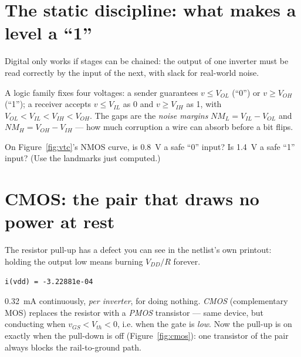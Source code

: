 \section{The static discipline: what makes a level a ``1''}
\label{sec:staticdisc}

Digital only works if stages can be chained: the output of one inverter must
be read correctly by the input of the next, with slack for real-world noise.

\begin{definition}
\label{def:noisemargin}
A logic family fixes four voltages: a sender guarantees $v \le V_{OL}$
(``0'') or $v \ge V_{OH}$ (``1''); a receiver accepts $v \le V_{IL}$ as 0
and $v \ge V_{IH}$ as 1, with $V_{OL} < V_{IL} < V_{IH} < V_{OH}$. The gaps
are the \emph{noise margins} $NM_L = V_{IL}-V_{OL}$ and
$NM_H = V_{OH}-V_{IH}$ — how much corruption a wire can absorb before a bit
flips.
\end{definition}

\begin{exercise}[easy]
On Figure~\ref{fig:vtc}'s NMOS curve, is \qty{0.8}{\volt} a safe ``0''
input? Is \qty{1.4}{\volt} a safe ``1'' input? (Use the landmarks just
computed.)
\end{exercise}

\section{CMOS: the pair that draws no power at rest}
\label{sec:cmos}

The resistor pull-up has a defect you can see in the netlist's own printout:
holding the output low means burning $V_{DD}/R$ forever.

\begin{lstlisting}[language={},caption={Last lines of \texttt{ngspice -b ch06\_nmos\_inv.cir} --- the static current while holding output low.}]
i(vdd) = -3.22881e-04
\end{lstlisting}

\qty{0.32}{\milli\ampere} continuously, \emph{per inverter}, for doing
nothing. \emph{CMOS} (complementary MOS) replaces the resistor
with a \emph{PMOS} transistor — same device, but conducting when
$v_{GS} < V_{th} < 0$, i.e. when the gate is \emph{low}. Now the pull-up is
on exactly when the pull-down is off (Figure~\ref{fig:cmos}): one transistor
of the pair always blocks the rail-to-ground path.

